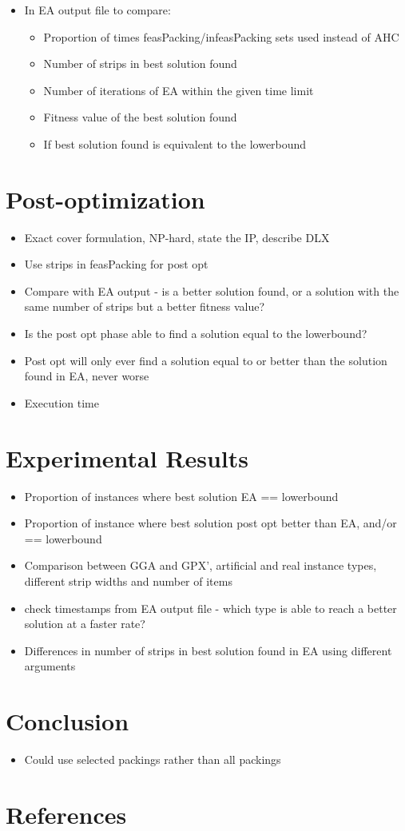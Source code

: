 \documentclass{elsarticle}
\begin{document}
\begin{itemize}
	\item In EA output file to compare:
	\begin{itemize}
		\item Proportion of times feasPacking/infeasPacking sets used instead of AHC
		\item Number of strips in best solution found
		\item Number of iterations of EA within the given time limit
		\item Fitness value of the best solution found
		\item If best solution found is equivalent to the lowerbound
	\end{itemize}	
	
\end{itemize}

\section{Post-optimization}
\begin{itemize}
	\item Exact cover formulation, NP-hard, state the IP, describe DLX
	\item Use strips in feasPacking for post opt
	\item Compare with EA output - is a better solution found, or a solution with the same number of strips but a better fitness value?
	\item Is the post opt phase able to find a solution equal to the lowerbound?
	\item Post opt will only ever find a solution equal to or better than the solution found in EA, never worse
	\item Execution time
\end{itemize}

\section{Experimental Results}
\begin{itemize}
	\item Proportion of instances where best solution EA == lowerbound
	\item Proportion of instance where best solution post opt better than EA, and/or == lowerbound
	\item Comparison between GGA and GPX', artificial and real instance types, different strip widths and number of items
	\item check timestamps from EA output file - which type is able to reach a better solution at a faster rate?
	\item Differences in number of strips in best solution found in EA using different arguments
\end{itemize}

\section{Conclusion}
\begin{itemize}
	\item Could use selected packings rather than all packings
\end{itemize}


\section*{References}

\end{document}
